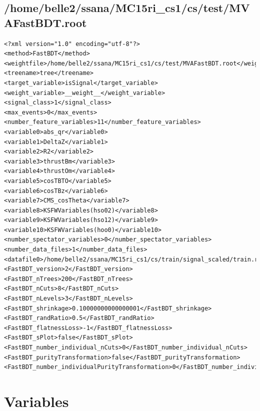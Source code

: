 \documentclass[10pt,a4paper]{article}
\begin{document}
\subsection{/home/belle2/ssana/MC15ri\_cs1/cs/test/MVAFastBDT.root}
\lstset{language=XML}
\begin{lstlisting}[breaklines=true]
<?xml version="1.0" encoding="utf-8"?>
<method>FastBDT</method>
<weightfile>/home/belle2/ssana/MC15ri_cs1/cs/test/MVAFastBDT.root</weightfile>
<treename>tree</treename>
<target_variable>isSignal</target_variable>
<weight_variable>__weight__</weight_variable>
<signal_class>1</signal_class>
<max_events>0</max_events>
<number_feature_variables>11</number_feature_variables>
<variable0>abs_qr</variable0>
<variable1>DeltaZ</variable1>
<variable2>R2</variable2>
<variable3>thrustBm</variable3>
<variable4>thrustOm</variable4>
<variable5>cosTBTO</variable5>
<variable6>cosTBz</variable6>
<variable7>CMS_cosTheta</variable7>
<variable8>KSFWVariables(hso02)</variable8>
<variable9>KSFWVariables(hso12)</variable9>
<variable10>KSFWVariables(hoo0)</variable10>
<number_spectator_variables>0</number_spectator_variables>
<number_data_files>1</number_data_files>
<datafile0>/home/belle2/ssana/MC15ri_cs1/cs/train/signal_scaled/train.root</datafile0>
<FastBDT_version>2</FastBDT_version>
<FastBDT_nTrees>200</FastBDT_nTrees>
<FastBDT_nCuts>8</FastBDT_nCuts>
<FastBDT_nLevels>3</FastBDT_nLevels>
<FastBDT_shrinkage>0.10000000000000001</FastBDT_shrinkage>
<FastBDT_randRatio>0.5</FastBDT_randRatio>
<FastBDT_flatnessLoss>-1</FastBDT_flatnessLoss>
<FastBDT_sPlot>false</FastBDT_sPlot>
<FastBDT_number_individual_nCuts>0</FastBDT_number_individual_nCuts>
<FastBDT_purityTransformation>false</FastBDT_purityTransformation>
<FastBDT_number_individualPurityTransformation>0</FastBDT_number_individualPurityTransformation>
\end{lstlisting}\raggedbottom
\pagebreak[0]
\FloatBarrier
\section{Variables}
\end{document}
